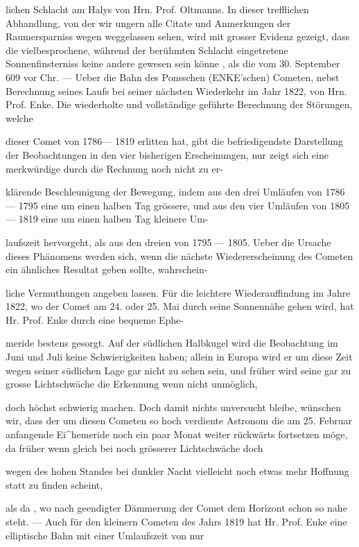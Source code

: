 \documentclass[10pt,a4paper]{article}
\begin{document}
lichen Schlacht am Halys von Hrn. Prof. Oltmanns. In dieser trefflichen Abhandlung, von der wir ungern alle Citate und Anmerkungen der Raumersparniss wegen weggelassen sehen, wird mit grosser Evidenz gezeigt, dass die vielbesprochene, während der berühmten Schlacht eingetretene Sonnenfinsterniss keine andere gewesen sein könne , als die vom 30. September 609 vor Chr. — Ueber die Bahn des Ponsschen (ENKE'schen) Cometen, nebst Berechnung seines Laufs bei seiner nächsten Wiederkehr im Jahr 1822, von Hrn. Prof. Enke. Die wiederholte und vollständige geführte Berechnung der Störungen, welche

dieser Comet von 1786— 1819 erlitten hat, gibt die befriedigendste Darstellung der Beobachtungen in den vier bisherigen Erscheinungen, nur zeigt sich eine merkwürdige durch die Rechnung noch nicht zu er-

klärende Beschleunigung der Bewegung, indem aus den drei Umläufen von 1786 — 1795 eine um einen halben Tag grössere, und aus den vier Umläufen von 1805 — 1819 eine um einen halben Tag kleinere Um-

laufszeit hervorgeht, als aus den dreien von 1795 — 1805. Ueber die Ursache dieses Phänomens werden sich, wenn die nächste Wiedererscheinung des Cometen ein ähnliches Resultat geben sollte, wahrschein-

liche Vermuthungen angeben lassen. Für die leichtere Wiederauffindung im Jahre 1822, wo der Comet am 24. oder 25. Mai durch seine Sonnennähe gehen wird, hat Hr. Prof. Enke durch eine bequeme Ephe-

meride bestens gesorgt. Auf der südlichen Halbkugel wird die Beobachtung im Juni und Juli keine Schwierigkeiten haben; allein in Europa wird er um diese Zeit wegen seiner südlichen Lage gar nicht zu sehen sein, und früher wird seine gar zu grosse Lichtschwäche die Erkennung wenn nicht unmöglich,

doch höchst schwierig machen. Doch damit nichts unversucht bleibe, wünschen wir, dass der um diesen Cometen so hoch verdiente Astronom die am 25. Februar anfangende Ei\textasciicircum{}hemeride noch ein paar Monat weiter rückwärts fortsetzen möge, da früher wenn gleich bei noch grösserer Lichtschwäche doch

wegen des hohen Standes bei dunkler Nacht vielleicht noch etwas mehr Hoffnung statt zu finden scheint,

als da , wo nach geendigter Dämmerung der Comet dem Horizont schon so nahe steht. — Auch für den kleinern Cometen des Jahrs 1819 hat Hr. Prof. Enke eine elliptische Bahn mit einer Umlaufszeit von nur
\end{document}
